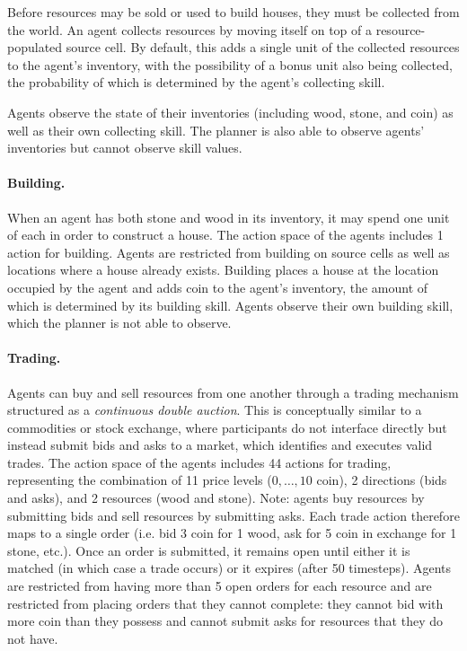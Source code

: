 Before resources may be sold or used to build houses, they must be collected from the world.
An agent collects resources by moving itself on top of a resource-populated source cell.
By default, this adds a single unit of the collected resources to the agent's inventory, with the possibility of a bonus unit also being collected, the probability of which is determined by the agent's collecting skill.

Agents observe the state of their inventories (including wood, stone, and coin) as well as their own collecting skill.
The planner is also able to observe agents' inventories but cannot observe skill values.


\paragraph{Building.}
When an agent has both stone and wood in its inventory, it may spend one unit of each in order to construct a house.
The action space of the agents includes 1 action for building.
Agents are restricted from building on source cells as well as locations where a house already exists.
Building places a house at the location occupied by the agent and adds coin to the agent's inventory, the amount of which is determined by its building skill.
Agents observe their own building skill, which the planner is not able to observe.


\paragraph{Trading.}
Agents can buy and sell resources from one another through a trading mechanism structured as a \textit{continuous double auction}.
This is conceptually similar to a commodities or stock exchange, where participants do not interface directly but instead submit bids and asks to a market, which identifies and executes valid trades.
The action space of the agents includes 44 actions for trading, representing the combination of 11 price levels ($0, \ldots, 10$ coin), 2 directions (bids and asks), and 2 resources (wood and stone).
Note: agents buy resources by submitting bids and sell resources by submitting asks.
Each trade action therefore maps to a single order (i.e. bid 3 coin for 1 wood, ask for 5 coin in exchange for 1 stone, etc.).
Once an order is submitted, it remains open until either it is matched (in which case a trade occurs) or it expires (after 50 timesteps).
Agents are restricted from having more than 5 open orders for each resource and are restricted from placing orders that they cannot complete: they cannot bid with more coin than they possess and cannot submit asks for resources that they do not have.

